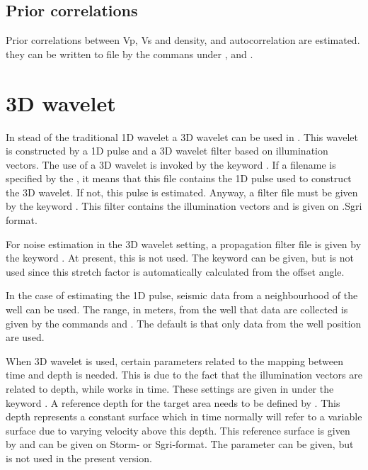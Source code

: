 \subsection{Prior correlations}
Prior correlations between Vp, Vs and density, and autocorrelation are estimated. they can be written to file by the commans  under ,  and .

\section{3D wavelet}
In stead of the traditional 1D wavelet a 3D wavelet can be used in \crava. This wavelet is constructed by a 1D pulse and a 3D wavelet filter based on illumination vectors.
The use of a 3D wavelet is invoked by the keyword . If a filename is specified by the , it means that this file contains the 1D pulse used to construct the 3D wavelet. If not, this pulse is estimated. Anyway, a filter file must be given by the keyword . This filter contains the illumination vectors and is given on .Sgri format. 

For noise estimation in the 3D wavelet setting, a propagation filter file is given by the keyword . At present, this is not used. The keyword  can be given, but is not used since this stretch factor is automatically calculated from the offset angle.

In the case of estimating the 1D pulse, seismic data from a neighbourhood of the well can be used. The range, in meters, from the well that data are collected is given by the commands  and . The default is that only data from the well position are used. 

When 3D wavelet is used, certain parameters related to the mapping between time and depth is needed. This is due to the fact that the illumination vectors are related to depth, while \crava works in time. These settings are given in  under the keyword \newline {}. A reference depth for the target area needs to be defined by . This depth represents a constant surface which in time normally will refer to a variable surface due to varying velocity above this depth. This reference surface is given by  and can be given on Storm- or Sgri-format. The parameter  can be given, but is not used in the present version. 


